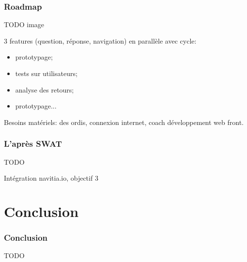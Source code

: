 \documentclass[table]{beamer}
\begin{document}
\begin{frame}
  \frametitle{Roadmap}

  TODO image

  3 features (question, réponse, navigation) en parallèle avec cycle:
  \begin{itemize}
  \item prototypage;
  \item tests sur utilisateurs;
  \item analyse des retours;
  \item prototypage...
  \end{itemize}

  Besoins matériels: des ordis, connexion internet, coach
  développement web front.
\end{frame}

\begin{frame}
  \frametitle{L'après SWAT}

  TODO

  Intégration navitia.io, objectif 3
\end{frame}

\section{Conclusion}

\begin{frame}
  \frametitle{Conclusion}

  TODO
\end{frame}
\end{document}
